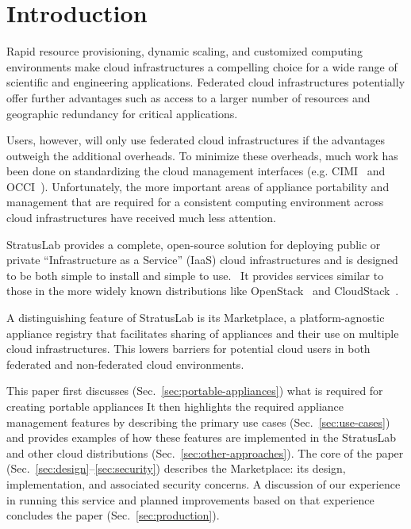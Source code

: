 \section{Introduction}
\label{sec:Introduction}

Rapid resource provisioning, dynamic scaling, and customized computing
environments make cloud infrastructures a compelling choice for a wide
range of scientific and engineering applications.  Federated cloud
infrastructures potentially offer further advantages such as access to
a larger number of resources and geographic redundancy for critical
applications.

Users, however, will only use federated cloud infrastructures if the
advantages outweigh the additional overheads.  To minimize these
overheads, much work has been done on standardizing the cloud
management interfaces (e.g. CIMI~\cite{cimi} and OCCI~\cite{occi}).
Unfortunately, the more important areas of appliance portability and
management that are required for a consistent computing environment
across cloud infrastructures have received much less attention.

StratusLab provides a complete, open-source solution for deploying
public or private ``Infrastructure as a Service'' (IaaS) cloud
infrastructures and is designed to be both simple to install and
simple to use.~\cite{slbook} It provides services similar to those in
the more widely known distributions like OpenStack~\cite{openstack}
and CloudStack~\cite{cloudstack}.

A distinguishing feature of StratusLab is its Marketplace, a
platform-agnostic appliance registry that facilitates sharing of
appliances and their use on multiple cloud infrastructures.  This
lowers barriers for potential cloud users in both federated and
non-federated cloud environments.

This paper first discusses (Sec.~\ref{sec:portable-appliances}) what
is required for creating portable appliances It then highlights the
required appliance management features by describing the primary use
cases (Sec.~\ref{sec:use-cases}) and provides examples of how these
features are implemented in the StratusLab and other cloud
distributions (Sec.~\ref{sec:other-approaches}).  The core of the
paper (Sec.~\ref{sec:design}--\ref{sec:security}) describes the
Marketplace: its design, implementation, and associated security
concerns.  A discussion of our experience in running this service and
planned improvements based on that experience concludes the paper
(Sec.~\ref{sec:production}).
